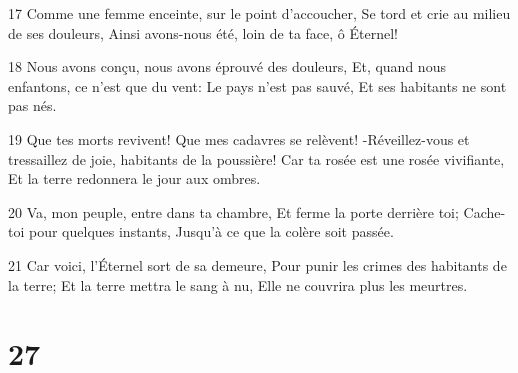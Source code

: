 \par 17 Comme une femme enceinte, sur le point d'accoucher, Se tord et crie au milieu de ses douleurs, Ainsi avons-nous été, loin de ta face, ô Éternel!
\par 18 Nous avons conçu, nous avons éprouvé des douleurs, Et, quand nous enfantons, ce n'est que du vent: Le pays n'est pas sauvé, Et ses habitants ne sont pas nés.
\par 19 Que tes morts revivent! Que mes cadavres se relèvent! -Réveillez-vous et tressaillez de joie, habitants de la poussière! Car ta rosée est une rosée vivifiante, Et la terre redonnera le jour aux ombres.
\par 20 Va, mon peuple, entre dans ta chambre, Et ferme la porte derrière toi; Cache-toi pour quelques instants, Jusqu'à ce que la colère soit passée.
\par 21 Car voici, l'Éternel sort de sa demeure, Pour punir les crimes des habitants de la terre; Et la terre mettra le sang à nu, Elle ne couvrira plus les meurtres.

\chapter{27}


